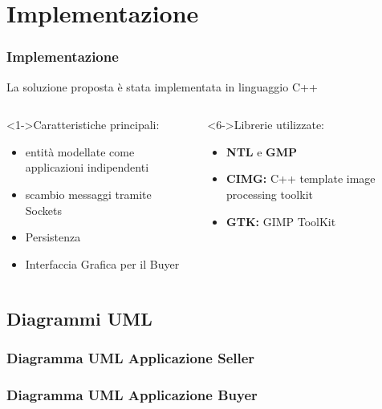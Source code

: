\section{Implementazione}
\begin{frame}
\frametitle{Implementazione}
La soluzione proposta è stata implementata in linguaggio C++
 \begin{columns}[l]  
\begin{block}<1->{Caratteristiche principali:}
\begin{itemize}
\item<2-> entità modellate come applicazioni indipendenti
\item<3-> scambio messaggi tramite Sockets
\item<4-> Persistenza
\item<5-> \alert<6,6>{Interfaccia Grafica per il Buyer}
\end{itemize}
\end{block}
\begin{block}<6->{Librerie utilizzate:}
\begin{itemize}
\item \textbf{NTL} e \textbf{GMP}
\item \textbf{CIMG:} C++ template image processing toolkit
\item \alert{\textbf{GTK:}} GIMP ToolKit
\end{itemize}
\end{block}
	  \begin{overprint}
	      \begin{center}\end{center}
	      \end{overprint}
   \end{columns}

\end{frame}

\subsection{Diagrammi UML}
\begin{frame}
\frametitle{Diagramma UML Applicazione Seller}
\begin{center}\end{center}
\end{frame}

\begin{frame}
\frametitle{Diagramma UML Applicazione Buyer}
\begin{center}\end{center}
\end{frame}


